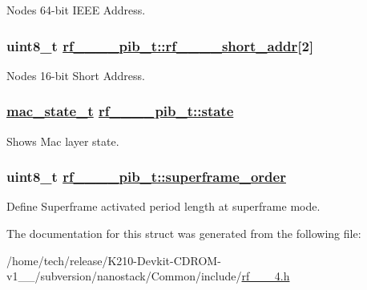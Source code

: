 Nodes 64-bit IEEE Address. \hypertarget{structrf__802__15__4__pib__t_14fd95a363f5d5c7a2c9e0a55fa73c92}{
\subsubsection[rf\_\-802\_\-15\_\-4\_\-short\_\-addr]{\setlength{\rightskip}{0pt plus 5cm}uint8\_\-t \hyperlink{structrf__802__15__4__pib__t_14fd95a363f5d5c7a2c9e0a55fa73c92}{rf\_\_\_\_\-pib\_\-t::rf\_\_\_\_\-short\_\-addr}\mbox{[}2\mbox{]}}}
\label{structrf__802__15__4__pib__t_14fd95a363f5d5c7a2c9e0a55fa73c92}


Nodes 16-bit Short Address. \hypertarget{structrf__802__15__4__pib__t_5919614e012e3cd8e90963e484f0a5c7}{
\subsubsection[state]{\setlength{\rightskip}{0pt plus 5cm}\hyperlink{rf__802__15__4_8h_222287b6ac933745e39ca393bb0cfe4f}{mac\_\-state\_\-t} \hyperlink{structrf__802__15__4__pib__t_5919614e012e3cd8e90963e484f0a5c7}{rf\_\_\_\_\-pib\_\-t::state}}}
\label{structrf__802__15__4__pib__t_5919614e012e3cd8e90963e484f0a5c7}


Shows Mac layer state. \hypertarget{structrf__802__15__4__pib__t_a1f33d99ac1287bc5c3616f4d3a5ab55}{
\subsubsection[superframe\_\-order]{\setlength{\rightskip}{0pt plus 5cm}uint8\_\-t \hyperlink{structrf__802__15__4__pib__t_a1f33d99ac1287bc5c3616f4d3a5ab55}{rf\_\_\_\_\-pib\_\-t::superframe\_\-order}}}
\label{structrf__802__15__4__pib__t_a1f33d99ac1287bc5c3616f4d3a5ab55}


Define Superframe activated period length at superframe mode. 

The documentation for this struct was generated from the following file:\begin{CompactItemize}
\item 
/home/tech/release/K210-Devkit-CDROM-v1\_\_/subversion/nanostack/Common/include/\hyperlink{rf__802__15__4_8h}{rf\_\_\_\-4.h}\end{CompactItemize}
